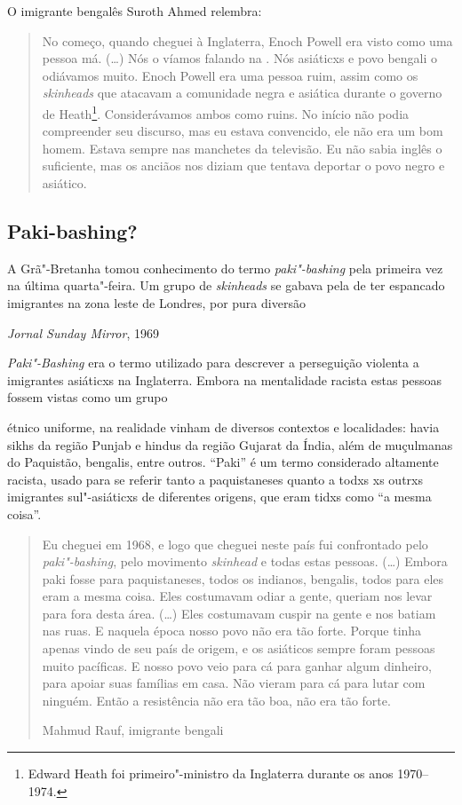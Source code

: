 O imigrante bengalês Suroth Ahmed relembra:

\begin{quote}
No começo, quando cheguei à Inglaterra, Enoch Powell era visto como uma pessoa má. (\ldots{}) Nós o víamos falando na . Nós asiáticxs e povo bengali o odiávamos muito. Enoch Powell era uma pessoa ruim, assim como os \emph{skinheads} que atacavam a comunidade negra e asiática durante o governo de Heath\footnote{Edward Heath foi primeiro"-ministro da Inglaterra durante os anos 1970--1974.}. Considerávamos ambos como ruins. No início não podia compreender seu discurso, mas eu estava convencido, ele não era um bom homem. Estava sempre nas manchetes da televisão. Eu não sabia inglês o suficiente, mas os anciãos nos diziam que tentava deportar o povo negro e asiático.
\end{quote}



\subsection{Paki-bashing?}

\epigraph{A Grã"-Bretanha tomou conhecimento do termo \emph{paki"-bashing} pela primeira vez na última quarta"-feira. Um grupo de \emph{skinheads} se gabava pela  de ter espancado imigrantes na zona leste de Londres, por pura diversão}{\textit{Jornal Sunday Mirror}, 1969}

\emph{Paki"-Bashing} era o termo utilizado para descrever a perseguição violenta a imigrantes 
asiáticxs na Inglaterra. Embora na mentalidade racista estas pessoas fossem vistas como um grupo \linebreak

\noindent{}étnico uniforme, na realidade vinham de diversos contextos e localidades: havia sikhs
da região Punjab e hindus da região Gujarat da Índia, além de muçulmanas do Paquistão, bengalis, entre outros. ``Paki'' é um termo considerado altamente racista, usado para se referir tanto a paquistaneses quanto a todxs xs outrxs imigrantes sul"-asiáticxs de diferentes origens, que eram tidxs como ``a mesma coisa''.

\begin{quote}
Eu cheguei em 1968, e logo que cheguei neste país fui confrontado pelo \emph{paki"-bashing}, pelo movimento \emph{skinhead} e todas estas pessoas. (\ldots{}) Embora paki fosse para paquistaneses, todos os indianos, bengalis, todos para eles eram a mesma coisa. Eles costumavam odiar a gente, queriam nos levar para fora desta área. (\ldots{}) Eles costumavam cuspir na gente e nos batiam nas ruas. E naquela época nosso povo não era tão forte. Porque tinha apenas vindo de seu país de origem, e os asiáticos sempre foram pessoas muito pacíficas. E nosso povo veio para cá para ganhar algum dinheiro, para apoiar suas famílias em casa. Não vieram para cá para lutar com ninguém. Então a resistência não era tão boa, não era tão forte.

Mahmud Rauf, imigrante bengali
\end{quote}

